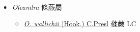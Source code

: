
  \begin{itemize}
 \item[    ] \textit{Oleandra} 條蕨屬
                                
  \begin{itemize}
        \item[] \href{http://www.theplantlist.org/tpl1.1/search?q=Oleandra+wallichii}{\textit{O. wallichii} (Hook.) C.Presl}   蓧蕨   LC
  \end{itemize}
  \end{itemize}
